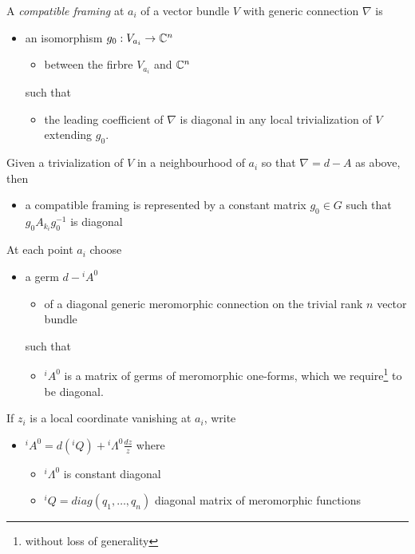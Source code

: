 \begin{frame}
  \begin{defn}
    A \emph{compatible framing} at $a_i$ of a vector bundle $V$ with generic
    connection $\nabla$ is
    \begin{itemize}
      \item an isomorphism $g_0:V_{a_i}\to\mathbb{C}^n$
      \begin{itemize}
        \item between the firbre $V_{a_i}$ and $\mathbb{C}^n$
      \end{itemize}
      such that
      \begin{itemize}
        \item the leading coefficient of $\nabla$ is diagonal in any local
          trivialization of $V$ extending $g_0$.
      \end{itemize}
    \end{itemize}
  \end{defn}
  Given a trivialization of $V$ in a neighbourhood of $a_i$ so that
  $\nabla=d-A$ as above, then
  \begin{itemize}
    \item a compatible framing is represented by a constant matrix  $g_0\in G$
      such that $g_0A_{k_i}g_0^{-1}$ is diagonal
  \end{itemize}
  \myfhr

  At each point $a_i$ choose
  \begin{itemize}
    \item a germ $d-{}^iA^0$
      \begin{itemize}
        \item of a diagonal generic meromorphic connection on the trivial rank
        $n$ vector bundle
      \end{itemize}
      such that
      \begin{itemize}
        \item ${}^iA^0$ is a matrix of germs of meromorphic one-forms, which we
          require\footnote{without loss of generality} to be diagonal.
      \end{itemize}
  \end{itemize}
  If $z_i$ is a local coordinate vanishing at $a_i$, write
  \begin{itemize}
    \item ${}^iA^0=d({}^iQ)+{}^i\Lambda^0\frac{dz}{z}$ where
      \begin{itemize}
        \item ${}^i\Lambda^0$ is constant diagonal
        \item ${}^iQ=diag(q_1,\dots,q_n)$ diagonal matrix of meromorphic
          functions
      \end{itemize}
  \end{itemize}
\end{frame}

